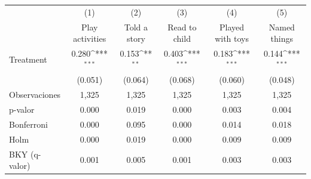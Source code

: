{
\def\sym#1{\ifmmode^{#1}\else\(^{#1}\)\fi}
\begin{tabular}{l*{5}{c}}
\toprule
                    &\multicolumn{1}{c}{(1)}&\multicolumn{1}{c}{(2)}&\multicolumn{1}{c}{(3)}&\multicolumn{1}{c}{(4)}&\multicolumn{1}{c}{(5)}\\
                    &\multicolumn{1}{c}{Play activities}&\multicolumn{1}{c}{Told a story}&\multicolumn{1}{c}{Read to child}&\multicolumn{1}{c}{Played with toys}&\multicolumn{1}{c}{Named things}\\
\midrule
Treatment           &       0.280\sym{***}&       0.153\sym{**} &       0.403\sym{***}&       0.183\sym{***}&       0.144\sym{***}\\
                    &     (0.051)         &     (0.064)         &     (0.068)         &     (0.060)         &     (0.048)         \\
\midrule
Observaciones       &       1,325         &       1,325         &       1,325         &       1,325         &       1,325         \\
p-valor             &       0.000         &       0.019         &       0.000         &       0.003         &       0.004         \\
Bonferroni          &       0.000         &       0.095         &       0.000         &       0.014         &       0.018         \\
Holm                &       0.000         &       0.019         &       0.000         &       0.009         &       0.009         \\
BKY (q-valor)       &       0.001         &       0.005         &       0.001         &       0.003         &       0.003         \\
\bottomrule
\end{tabular}
}

